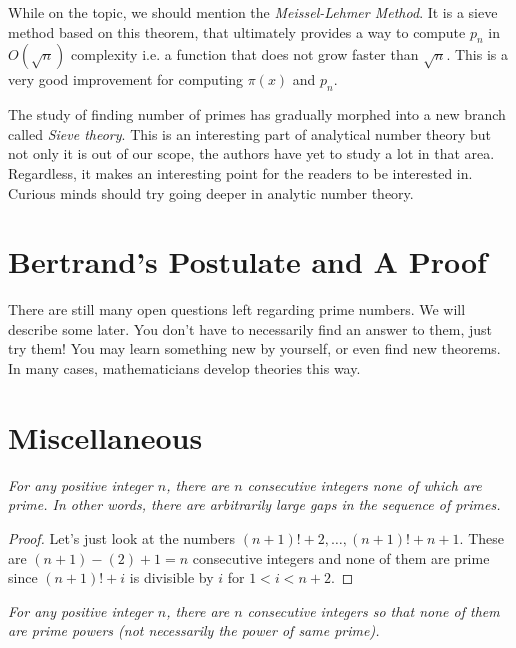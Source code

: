\documentclass{subfiles}
\begin{document}
	While on the topic, we should mention the \textit{Meissel-Lehmer Method}. It is a sieve method based on this theorem, that ultimately provides a way to compute $p_n$ in $O(\sqrt{n})$ complexity i.e. a function that does not grow faster than $\sqrt{n}$. This is a very good improvement for computing $\pi(x)$ and $p_n$.
	\begin{note}
		The study of finding number of primes has gradually morphed into a new branch called \textit{Sieve theory}. This is an interesting part of analytical number theory but not only it is out of our scope, the authors have yet to study a lot in that area. Regardless, it makes an interesting point for the readers to be interested in. Curious minds should try going deeper in analytic number theory. 
	\end{note}

	\section{Bertrand's Postulate and A Proof}\label{sec:bertrand}
			
		There are still many open questions left regarding prime numbers. We will describe some later. You don't have to necessarily find an answer to them, just try them! You may learn something new by yourself, or even find new theorems. In many cases, mathematicians develop theories this way.
	
	\section{Miscellaneous}
	\label{sec:theoremsinprimes}
	
	\begin{theorem}\slshape
		For any positive integer $n$, there are $n$ consecutive integers none of which are prime. In other words, there are arbitrarily large gaps in the sequence of primes.
	\end{theorem}
	
	\begin{proof}
		Let's just look at the numbers $(n+1)!+2,\ldots,(n+1)!+n+1$. These are $(n+1)-(2)+1=n$ consecutive integers and none of them are prime since $(n+1)!+i$ is divisible by $i$ for $1<i<n+2$.
	\end{proof}
	
	\begin{theorem}\slshape
		For any positive integer $n$, there are $n$ consecutive integers so that none of them are prime powers (not necessarily the power of same prime).
	\end{theorem}
	
\end{document}
